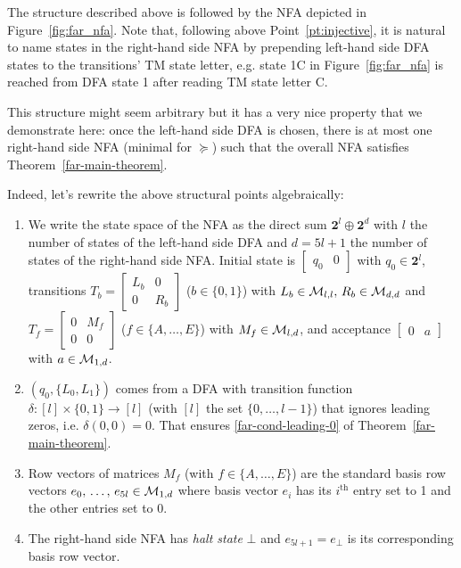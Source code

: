\begin{example}\normalfont
  The structure described above is followed by the NFA depicted in Figure~\ref{fig:far_nfa}. Note that, following above Point~\ref{pt:injective}, it is natural to name states in the right-hand side NFA by prepending left-hand side DFA states to the transitions' TM state letter, e.g. state 1C in Figure~\ref{fig:far_nfa} is reached from DFA state 1 after reading TM state letter C.
\end{example}

This structure might seem arbitrary but it has a very nice property that we demonstrate here: once the left-hand side DFA is chosen, there is at most one right-hand side NFA (minimal for $\succeq$) such that the overall NFA satisfies Theorem~\ref{far-main-theorem}.



Indeed, let's rewrite the above structural points algebraically:


\begin{enumerate}
  \item We write the state space of the NFA as the direct sum $\mathbf{2}^l \oplus \mathbf{2}^d$ with $l$ the number of states of the left-hand side DFA and $d=5l+1$ the number of states of the right-hand side NFA. Initial state is $\begin{bmatrix}q_0&0\end{bmatrix}$ with $q_0 \in \mathbf{2}^l$,
        transitions
        $T_b=\begin{bmatrix}L_b&0\\0&R_b\end{bmatrix}$ ($b\in\{0,1\}$) with $L_b \in \mathcal{M}_{l,l},\, R_b \in \mathcal{M}_{d,d}$ and
        $T_f=\begin{bmatrix}0&M_f\\0&0\end{bmatrix}$ ($f\in\{A,\ldots,E\}$) with $M_f \in \mathcal{M}_{l,d}$,
        and acceptance $\begin{bmatrix}0&a\end{bmatrix}$ with $a \in \mathcal{M}_{1,d}$.
  \item $(q_0,\{L_0, L_1\})$ comes from a DFA with transition function $\delta: [l] \times \{0,1\} \to [l]$ (with $[l]$ the set $\{0,\dots,l-1\}$) that ignores leading zeros, i.e. $\delta(0,0) = 0$. That ensures \eqref{far-cond-leading-0} of Theorem~\ref{far-main-theorem}.
  \item Row vectors of matrices $M_f$ (with $f\in\{A,\ldots,E\}$) are the standard basis row vectors $e_0,\, \dots,\, e_{5l} \in \mathcal{M}_{1,d}$ where basis vector $e_i$ has its $i^\text{th}$ entry set to 1 and the other entries set to 0.\label{pt:basis}
  \item The right-hand side NFA has \textit{halt state} $\bot$ and $e_{5l+1} = e_\bot$ is its corresponding basis row vector.

\end{enumerate}


